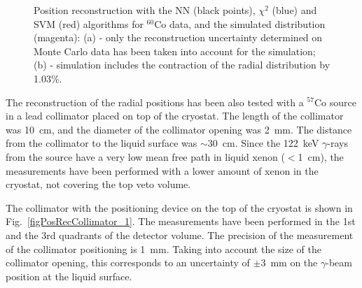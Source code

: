 \begin{figure}[!h]
\centering
{}
\caption[Position reconstruction with the NN, $\chi^{2}$ and SVM algorithms for $^{60}$Co data, and the simulated distribution]{Position reconstruction with the NN (black points), $\chi^{2}$ (blue) and SVM (red) algorithms for $^{60}$Co data, and the simulated distribution (magenta): (a) - only the reconstruction uncertainty determined on Monte Carlo data has been taken into account for the simulation; (b) - simulation includes the contraction of the radial distribution by 1.03\%.}
\label{figPosRecCo60}
\end{figure}

The reconstruction of the radial positions has been also tested with a $^{57}$Co source in a lead collimator placed on top of the cryostat. The length of the collimator was 10~cm, and the diameter of the collimator opening was 2~mm. The distance from the collimator to the liquid surface was $\sim$30~cm. Since the 122~keV $\gamma$-rays from the source have a very low mean free path in liquid xenon ($<$1~cm), the measurements have been performed with a lower amount of xenon in the cryostat, not covering the top veto volume.

The collimator with the positioning device on the top of the cryostat is shown in Fig.~\ref{figPosRecCollimator_1}. The measurements have been performed in the 1st and the 3rd quadrants of the detector volume. The precision of the measurement of the collimator positioning is 1~mm. Taking into account the size of the collimator opening, this corresponds to an uncertainty of $\pm$3~mm on the $\gamma$-beam position at the liquid surface. 

